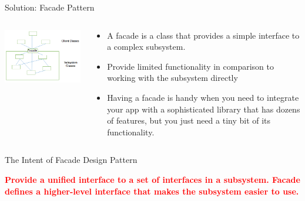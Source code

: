 \documentclass[13pt]{beamer}
\begin{document}
\begin{frame}{Solution: Facade Pattern}
	\begin{columns}[T]
		\begin{column}{.5\textwidth}
			\includegraphics[scale=0.6]{./images/solution.jpg}
		\end{column}
	
		\begin{column}{.5\textwidth}
			\begin{itemize}
				\item A facade is a class that provides a simple interface to a complex subsystem.
				\item Provide limited functionality in comparison to working with the subsystem directly
				\item Having a facade is handy when you need to integrate your app with a sophisticated library that has dozens of features, but you just need a tiny bit of its functionality.
			\end{itemize}
		\end{column}
	\end{columns}
\end{frame}

\begin{frame}{The Intent of Facade Design Pattern}
	\begin{center}
	\textcolor{red}{\textbf{Provide a unified interface to a set of interfaces in a subsystem. Facade defines a higher-level interface that makes the subsystem easier to use.}}\\
	\end{center}
\end{frame}
\end{document}
